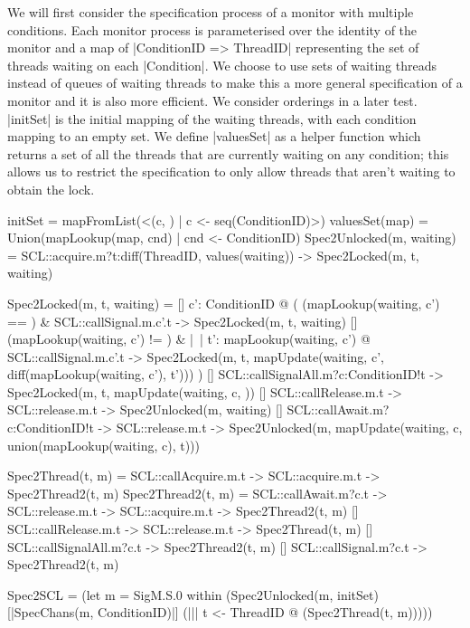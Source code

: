 We will first consider the specification process of a monitor with multiple conditions. Each monitor process is parameterised over the identity of the monitor and a map of |ConditionID => {ThreadID}| representing the set of threads waiting on each |Condition|. We choose to use sets of waiting threads instead of queues of waiting threads to make this a more general specification of a monitor and it is also more efficient. We consider orderings in a later test. |initSet| is the initial mapping of the waiting threads, with each condition mapping to an empty set. We define |valuesSet| as a helper function which returns a set of all the threads that are currently waiting on any condition; this allows us to restrict the specification to only allow threads that aren't waiting to obtain the lock. 

\begin{cspm}
initSet = mapFromList(<(c, {}) | c <- seq(ConditionID)>)
valuesSet(map) = Union({mapLookup(map, cnd) | cnd <- ConditionID})
Spec2Unlocked(m, waiting) = 
  SCL::acquire.m?t:diff(ThreadID, values(waiting)) -> Spec2Locked(m, t, waiting)

Spec2Locked(m, t, waiting) =
  [] c': ConditionID @  
      (   
          (mapLookup(waiting, c') == {}) & SCL::callSignal.m.c'.t ->
             Spec2Locked(m, t, waiting)
       [] (mapLookup(waiting, c') != {}) & 
            |~| t': mapLookup(waiting, c') @ SCL::callSignal.m.c'.t -> 
                Spec2Locked(m, t, 
                            mapUpdate(waiting, c', diff(mapLookup(waiting, c'), {t'})))            
      )
  [] SCL::callSignalAll.m?c:ConditionID!t -> 
            Spec2Locked(m, t, mapUpdate(waiting, c, {}))
  [] SCL::callRelease.m.t -> SCL::release.m.t ->
        Spec2Unlocked(m, waiting)
  [] SCL::callAwait.m?c:ConditionID!t -> SCL::release.m.t ->
        Spec2Unlocked(m, mapUpdate(waiting, c, union(mapLookup(waiting, c), {t})))


Spec2Thread(t, m) = SCL::callAcquire.m.t -> SCL::acquire.m.t -> Spec2Thread2(t, m)
Spec2Thread2(t, m) = 
     SCL::callAwait.m?c.t -> SCL::release.m.t -> SCL::acquire.m.t -> Spec2Thread2(t, m)
  [] SCL::callRelease.m.t -> SCL::release.m.t -> Spec2Thread(t, m)
  [] SCL::callSignalAll.m?c.t -> Spec2Thread2(t, m)
  [] SCL::callSignal.m?c.t -> Spec2Thread2(t, m)

Spec2SCL = (let m = SigM.S.0 within 
  (Spec2Unlocked(m, initSet) [|SpecChans(m, ConditionID)|]
      (||| t <- ThreadID @ (Spec2Thread(t, m)))))
  \end{cspm}


